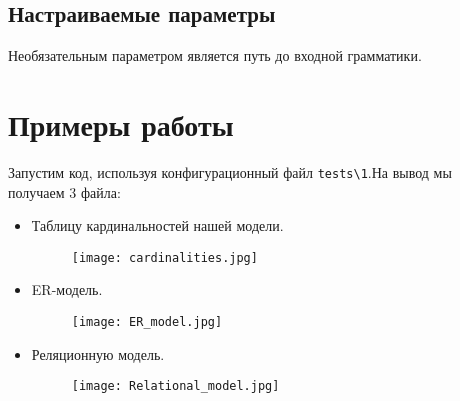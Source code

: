 \documentclass{article}
\begin{document}
\subsection{Настраиваемые параметры}
\qquad Необязательным параметром является путь до входной грамматики.


\section{Примеры работы}

\qquad Запустим код, используя конфигурационный файл \verb|tests\1|.На вывод мы получаем 3 файла:
\begin{itemize}
\item Таблицу кардинальностей нашей модели. 

\begin{figure}[h]
\centering
\texttt{[image: cardinalities.jpg]}
\label{fig:mpr}
\end{figure}

\item ER-модель.

\begin{figure}[h]
\centering
\texttt{[image: ER\_model.jpg]}
\label{fig:mpr}
\end{figure}

\item Реляционную модель.

\begin{figure}[h]
\centering
\texttt{[image: Relational\_model.jpg]}
\label{fig:mpr}
\end{figure}

\end{itemize}
\end{document}
